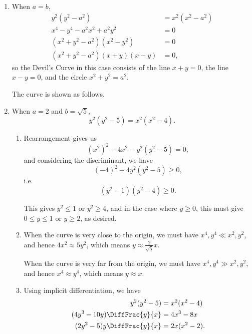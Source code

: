 \Question{\currfilebase}

\begin{enumerate}
    \item When \(a = b\),
          \begin{align*}
              y^2 (y^2 - a^2)                   & = x^2 (x^2 - a^2) \\
              x^4 - y^4 - a^2 x^2 + a^2 y^2     & = 0               \\
              (x^2 + y^2 - a^2) (x^2 - y^2)     & = 0               \\
              (x^2 + y^2 - a^2) (x + y) (x - y) & = 0,
          \end{align*}
          so the Devil's Curve in this case consists of the line \(x + y = 0\), the line \(x - y = 0\), and the circle \(x^2 + y^2 = a^2\).

          The curve is shown as follows.
          \begin{center}
              
          \end{center}

    \item When \(a = 2\) and \(b = \sqrt{5}\),
          \[
              y^2 (y^2 - 5) = x^2 (x^2 - 4).
          \]
          \begin{enumerate}
              \item Rearrangement gives us
                    \[
                        (x^2)^2 - 4x^2 - y^2 (y^2 - 5) = 0,
                    \]
                    and considering the discriminant, we have
                    \[
                        (-4)^2 + 4 y^2 (y^2 - 5) \geq 0,
                    \]
                    i.e.
                    \[
                        \left(y^2 - 1\right) \left(y^2 - 4\right) \geq 0.
                    \]

                    This gives \(y^2 \leq 1\) or \(y^2 \geq 4\), and in the case where \(y \geq 0\), this must give \(0 \leq y \leq 1\) or \(y \geq 2\), as desired.
              \item When the curve is very close to the origin, we must have \(x^4, y^4 \ll x^2, y^2\), and hence \(4x^2 \approx 5y^2\), which means \(y \approx \frac{2}{\sqrt{5}}x\).

                    When the curve is very far from the origin, we must have \(x^4, y^4 \gg x^2, y^2\), and hence \(x^4 \approx y^4\), which means \(y \approx x\).

              \item Using implicit differentiation, we have
                    \begin{align*}
                        y^2 (y^2 - 5)                & = x^2 (x^2 - 4) \\
                        (4y^3 - 10y) \DiffFrac{y}{x} & = 4x^3 - 8x     \\
                        (2y^2 - 5)y \DiffFrac{y}{x}  & = 2x(x^2 - 2).
                    \end{align*}


\end{enumerate}
\end{enumerate}
